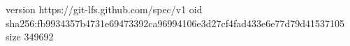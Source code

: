 version https://git-lfs.github.com/spec/v1
oid sha256:fb9934357b4731e69473392ca96994106e3d27cf4fad433e6e77d79d41537105
size 349692
